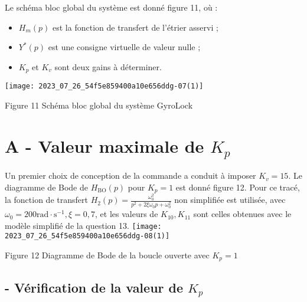 Le schéma bloc global du système est donné figure 11, où :

\begin{itemize}
  \item $H_{m}(p)$ est la fonction de transfert de l'étrier asservi ;

  \item $Y^{*}(p)$ est une consigne virtuelle de valeur nulle ;

  \item $K_{p}$ et $K_{v}$ sont deux gains à déterminer.

\end{itemize}

\begin{center}
\texttt{[image: 2023\_07\_26\_54f5e859400a10e656ddg-07(1)]}
\end{center}

Figure 11 Schéma bloc global du système GyroLock

\section{A - Valeur maximale de $K_{p}$}


Un premier choix de conception de la commande a conduit à imposer $K_{v}=15$. Le diagramme de Bode de $H_{\mathrm{BO}}(p)$ pour $K_{p}=1$ est donné figure 12. Pour ce tracé, la fonction de transfert $H_{2}(p)=\frac{\omega_{0}^{2}}{p^{2}+2 \xi \omega_{0} p+\omega_{0}^{2}}$ non simplifiée est utilisée, avec $\omega_{0}=200 \mathrm{rad} \cdot \mathrm{s}^{-1}, \xi=0,7$, et les valeurs de $K_{10}, K_{11}$ sont celles obtenues avec le modèle simplifié de la question 13.
\texttt{[image: 2023\_07\_26\_54f5e859400a10e656ddg-08(1)]}

Figure 12 Diagramme de Bode de la boucle ouverte avec $K_{p}=1$


\subsection{\label{sec:III.B} - Vérification de la valeur de $K_{p}$}

